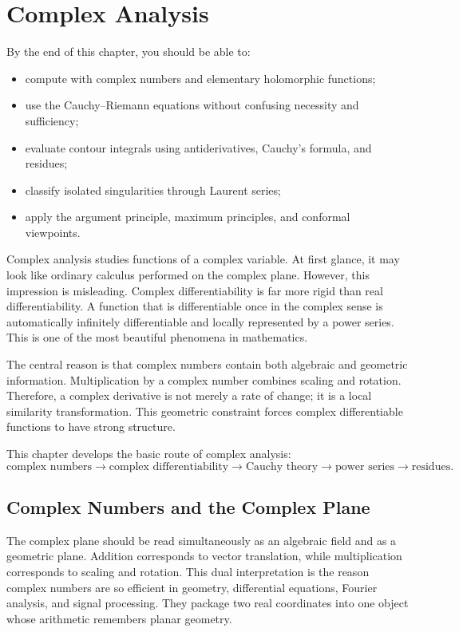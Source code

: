 \chapter{Complex Analysis}

\begin{learningobjectives}
By the end of this chapter, you should be able to:
\begin{itemize}
    \item compute with complex numbers and elementary holomorphic functions;
    \item use the Cauchy--Riemann equations without confusing necessity and sufficiency;
    \item evaluate contour integrals using antiderivatives, Cauchy's formula, and residues;
    \item classify isolated singularities through Laurent series;
    \item apply the argument principle, maximum principles, and conformal viewpoints.
\end{itemize}
\end{learningobjectives}

Complex analysis studies functions of a complex variable. At first glance, it may look like ordinary calculus performed on the complex plane. However, this impression is misleading. Complex differentiability is far more rigid than real differentiability. A function that is differentiable once in the complex sense is automatically infinitely differentiable and locally represented by a power series. This is one of the most beautiful phenomena in mathematics.

The central reason is that complex numbers contain both algebraic and geometric information. Multiplication by a complex number combines scaling and rotation. Therefore, a complex derivative is not merely a rate of change; it is a local similarity transformation. This geometric constraint forces complex differentiable functions to have strong structure.

This chapter develops the basic route of complex analysis:
\[
    \text{complex numbers}\to\text{complex differentiability}\to\text{Cauchy theory}\to\text{power series}\to\text{residues}.
\]

\section{Complex Numbers and the Complex Plane}


The complex plane should be read simultaneously as an algebraic field and as a geometric plane. Addition corresponds to vector translation, while multiplication corresponds to scaling and rotation. This dual interpretation is the reason complex numbers are so efficient in geometry, differential equations, Fourier analysis, and signal processing. They package two real coordinates into one object whose arithmetic remembers planar geometry.

